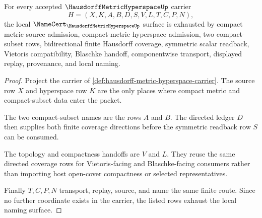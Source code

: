 \begin{theorem}
\label{thm:hausdorff-metric-hyperspace-namecert-obligations}
For every accepted $\HausdorffMetricHyperspaceUp$ carrier
$$
H=(X,K,A,B,D,S,V,L,T,C,P,N),
$$
the local $\NameCert_{\HausdorffMetricHyperspaceUp}$ surface is exhausted by compact metric source admission, compact-metric hyperspace admission, two compact-subset rows, bidirectional finite Hausdorff coverage, symmetric scalar readback, Vietoris compatibility, Blaschke handoff, componentwise transport, displayed replay, provenance, and local naming.
\end{theorem}
\begin{proof}
Project the carrier of \autoref{def:hausdorff-metric-hyperspace-carrier}. The source row $X$ and hyperspace row $K$ are the only places where compact metric and compact-subset data enter the packet.

The two compact-subset names are the rows $A$ and $B$. The directed ledger $D$ then supplies both finite coverage directions before the symmetric readback row $S$ can be consumed.

The topology and compactness handoffs are $V$ and $L$. They reuse the same directed coverage rows for Vietoris-facing and Blaschke-facing consumers rather than importing host open-cover compactness or selected representatives.

Finally $T,C,P,N$ transport, replay, source, and name the same finite route. Since no further coordinate exists in the carrier, the listed rows exhaust the local naming surface.
\end{proof}

